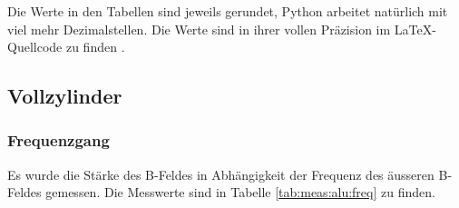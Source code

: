 Die Werte in  den Tabellen sind jeweils gerundet,  Python arbeitet nat\"urlich
mit viel  mehr Dezimalstellen. Die Werte  sind in ihrer vollen  Pr\"azision im
\LaTeX-Quellcode zu finden \cite{ref:aw:github}.


{%
    \clearpage
    \pdfpagewidth
	\textwidth
    \addtolength{\textwidth}{70mm}


    \subsection{Vollzylinder}
    \label{sec:ausw:subsec:hohlz}


    \subsubsection{Frequenzgang}
    \label{sec:ausw:subsec:hohlz:subsubsec:steel}

	\begin{minipage}[t]{0.33\textwidth}
        \vspace{0pt}
        Es  wurde  die  St\"arke  des  B-Feldes  in  Abh\"angigkeit  der  Frequenz
        des   \"ausseren  B-Feldes   gemessen. Die  Messwerte   sind  in   Tabelle
        \ref{tab:meas:alu:freq} zu finden.


\end{minipage}}
